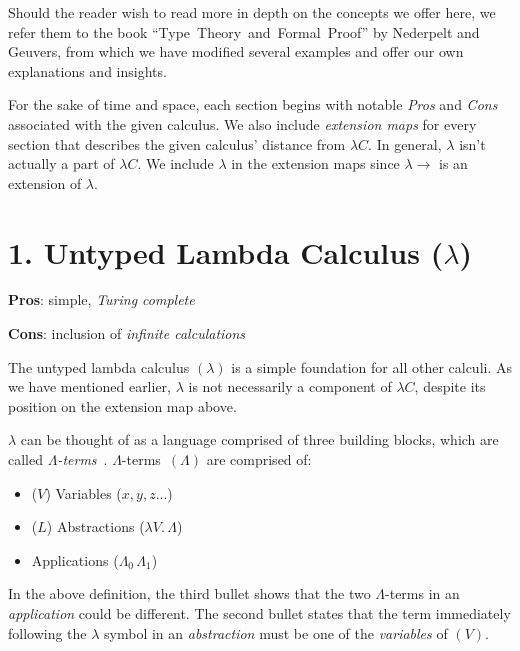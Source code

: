 \documentclass[9pt,preprint,nocopyrightspace,computermodern]{sigplanconf} %
\begin{document}
Should the reader wish to read more in depth on the concepts we offer here, we refer them
to the book \mbox{``Type Theory and Formal Proof''} \cite{rng} by Nederpelt and \mbox{Geuvers},
from which we have modified several examples and offer our own explanations and insights.

For the sake of time and space, each section begins with notable \textit{Pros} and
\textit{Cons} associated with the given calculus. We also include \textit{extension maps}
for every section that describes the given calculus' distance from \(\lambda C\).
In general, \(\lambda\) isn't actually a part of \(\lambda C\). We include
\(\lambda\) in the extension maps since \(\lambda\!\!\rightarrow\) is an extension
of \(\lambda\).

\section*{1. Untyped Lambda Calculus (\(\lambda\))}
\begin{flushleft}
  \textbf{Pros}: simple, \textit{Turing complete}
  \par
  \textbf{Cons}: inclusion of \textit{infinite calculations}
\end{flushleft}
The untyped lambda calculus \((\lambda)\) is a simple foundation for all other calculi.
As we have mentioned earlier, \(\lambda\) is not necessarily a component of \(\lambda C\),
despite its position on the extension map above.

\(\lambda\) can be thought of as a language comprised of three building blocks, which
are called \mbox{\textit{\(\Lambda\)-terms}~\cite{bar1}.}
\mbox{\(\Lambda\)-terms \((\Lambda)\)} are comprised of:
\begin{itemize}
\item (\(V\)) Variables (\(x,y,z ...\))
\item (\(L\)) Abstractions (\(\lambda V.\,\Lambda\))
\item Applications (\(\Lambda_0\,\Lambda_1\))
\end{itemize}
In the above definition, the third bullet shows that the two \(\Lambda\)-terms
in an \textit{application} could be different. The second bullet states
that the term immediately following the \(\lambda\) symbol in
an \textit{abstraction} must be one of the \textit{variables} of \((V)\).
\end{document}
